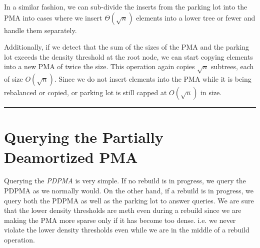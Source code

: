 \documentclass{article}
\newenvironment{proof}{{\bf Proof:  }}{\hfill\rule{2mm}{2mm}}
\begin{document}
\begin{proof}
\begin{enumerate}
\end{enumerate}

In a similar fashion, we can sub-divide the inserts from the parking
lot into the PMA into cases where we insert $\Theta(\sqrt{n})$
elements into a lower tree or fewer and handle them separately.

Additionally, if we detect that the sum of the sizes of the PMA and
the parking lot exceeds the density threshold at the root node, we can
start copying elements into a new PMA of twice the size. This
operation again copies $\sqrt{n}$ subtrees, each of size
$O(\sqrt{n})$. Since we do not insert elements into the PMA while it
is being rebalanced or copied, or parking lot is still capped at
$O(\sqrt{n})$ in size.

\end{proof}

\section{Querying the Partially Deamortized PMA}

Querying the \textit{PDPMA} is very simple. If no rebuild is in
progress, we query the PDPMA as we normally would. On the other hand,
if a rebuild is in progress, we query both the PDPMA as well as the
parking lot to answer queries. We are sure that the lower density
thresholds are meth even during a rebuild since we are making the PMA
more sparse only if it has become too dense. i.e. we never violate the
lower density thresholds even while we are in the middle of a rebuild
operation.
\end{document}
